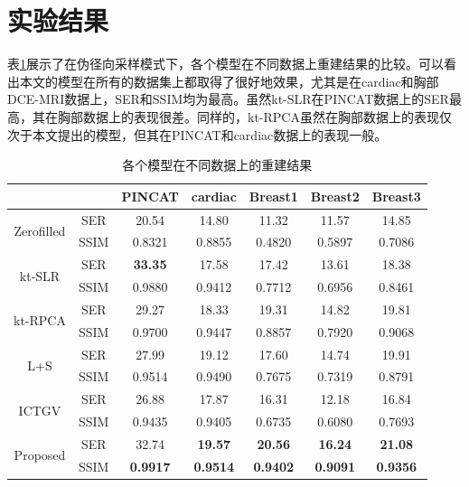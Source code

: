 \section{实验结果}
表\ref{tab:result3}展示了在伪径向采样模式下，各个模型在不同数据上重建结果的比较。可以看出本文的模型在所有的数据集上都取得了很好地效果，尤其是在cardiac和胸部DCE-MRI数据上，SER和SSIM均为最高。虽然kt-SLR在PINCAT数据上的SER最高，其在胸部数据上的表现很差。同样的，kt-RPCA虽然在胸部数据上的表现仅次于本文提出的模型，但其在PINCAT和cardiac数据上的表现一般。
\begin{table}
	\centering
	\caption{各个模型在不同数据上的重建结果}
	\begin{tabular}{|c|c|c|c|c|c|c|}
		\hline
		\hline
		\multicolumn{2}{|c|}{\diagbox{模型}{数据集}}& PINCAT & cardiac & Breast1 & Breast2 & Breast3\\	
		\hline
		\multirow{2}{*}{Zerofilled}
		&SER & 20.54 & 14.80 & 11.32 & 11.57 & 14.85\\
		\cline{2-7}&SSIM & 0.8321 & 0.8855 & 0.4820 & 0.5897 & 0.7086\\
		\hline
		\multirow{2}{*}{kt-SLR}
		&SER & \textbf{33.35} & 17.58 & 17.42 & 13.61 & 18.38\\
		\cline{2-7}&SSIM & 0.9880 & 0.9412 & 0.7712 & 0.6956 & 0.8461\\
		\hline
		\multirow{2}{*}{kt-RPCA}
		&SER & 29.27 & 18.33 & 19.31 & 14.82 & 19.81\\
		\cline{2-7}&SSIM & 0.9700 & 0.9447 & 0.8857 & 0.7920 & 0.9068\\
		\hline
		\multirow{2}{*}{L+S}
		&SER & 27.99 & 19.12 & 17.60 & 14.74 & 19.91\\
		\cline{2-7}&SSIM & 0.9514 & 0.9490 & 0.7675 & 0.7319 & 0.8791\\
		\hline
		\multirow{2}{*}{ICTGV}
		&SER & 26.88 & 17.87 & 16.31 & 12.18 & 16.84\\
		\cline{2-7}&SSIM & 0.9435 & 0.9405 & 0.6735 & 0.6080 & 0.7693\\
		\hline
		\multirow{2}{*}{Proposed}
		&SER & 32.74 & \textbf{19.57} & \textbf{20.56} & \textbf{16.24} & \textbf{21.08}\\
		\cline{2-7}&SSIM & \textbf{0.9917} & \textbf{0.9514} & \textbf{0.9402} & \textbf{0.9091} & \textbf{0.9356}\\
		\hline
	\end{tabular}
	\label{tab:result3}
\end{table}


